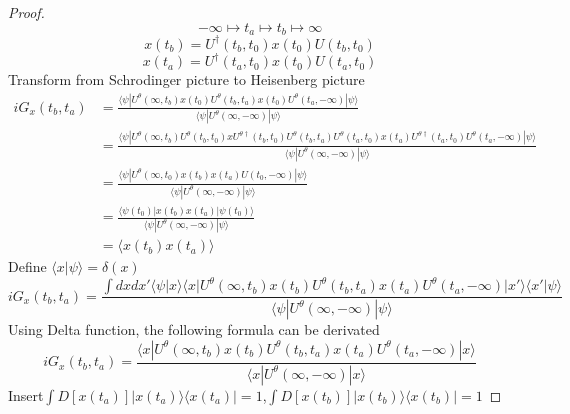 \documentclass[a4paper,11pt]{article}
\newtheorem{proof}{proof}[section]
\begin{document}
\begin{proof}
  \begin{equation*}
    -\infty\longmapsto t_a\longmapsto t_b\longmapsto\infty
  \end{equation*}
  \begin{equation*}
    x(t_b)=U^\dag(t_b,t_0)x(t_0)U(t_b,t_0)
  \end{equation*}
  \begin{equation*}
    x(t_a)=U^\dag(t_a,t_0)x(t_0)U(t_a,t_0)
  \end{equation*}
  Transform from Schrodinger picture to Heisenberg picture
  \begin{equation*}
    \begin{split}
       iG_{x}(t_b,t_a)&=\frac{\langle\psi|U^{\theta}(\infty,t_b)x(t_0)U^\theta(t_b,t_a)x(t_0)U^\theta(t_a,-\infty)|\psi\rangle}{\langle\psi|U^\theta(\infty,-\infty)|\psi\rangle}\\
         &=\frac{\langle\psi|U^{\theta}(\infty,t_b)U^\theta(t_b,t_0)xU^{\theta\dag}(t_b,t_0)U^\theta(t_b,t_a)U^\theta(t_a,t_0)x(t_a)U^{\theta\dag}(t_a,t_0)U^\theta(t_a,-\infty)|\psi\rangle}{\langle\psi|U^\theta(\infty,-\infty)|\psi\rangle}\\
         &=\frac{\langle\psi|U^\theta(\infty,t_0)x(t_b)x(t_a)U(t_0,-\infty)|\psi\rangle}{\langle\psi|U^\theta(\infty,-\infty)|\psi\rangle}\\
         &=\frac{\langle\psi(t_0)|x(t_b)x(t_a)|\psi(t_0)\rangle}{\langle\psi|U^\theta(\infty,-\infty)|\psi\rangle}\\
         &=\langle x(t_b)x(t_a)\rangle
    \end{split}
  \end{equation*}
  Define $\langle x|\psi\rangle=\delta(x)$\\
  \begin{equation*}
    iG_x(t_b,t_a)=\frac{\int dxdx'\langle\psi|x\rangle\langle x|U^\theta(\infty,t_b)x(t_b)U^\theta(t_b,t_a)x(t_a)U^\theta(t_a,-\infty)|x'\rangle\langle x'|\psi\rangle}{\langle\psi|U^\theta(\infty,-\infty)|\psi\rangle}
  \end{equation*}
  Using Delta function, the following formula can be derivated\\
  \begin{equation*}
    iG_x(t_b,t_a)=\frac{\langle x|U^\theta(\infty,t_b)x(t_b)U^\theta(t_b,t_a)x(t_a)U^\theta(t_a,-\infty)|x\rangle}{\langle x|U^\theta(\infty,-\infty)|x\rangle}
  \end{equation*}
  Insert$\int D[x(t_a)]|x(t_a)\rangle\langle x(t_a)|=1$,$\int D[x(t_b)]|x(t_b)\rangle\langle x(t_b)|=1$

\end{proof}
\end{document}
